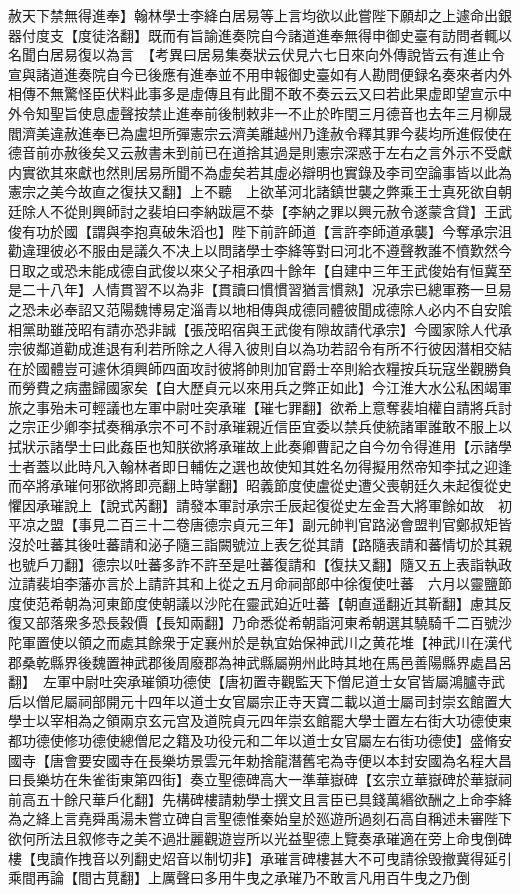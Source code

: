 赦天下禁無得進奉】翰林學士李絳白居易等上言均欲以此嘗陛下願却之上遽命出銀器付度支【度徒洛翻】既而有旨諭進奏院自今諸道進奉無得申御史臺有訪問者輒以名聞白居易復以為言　【考異曰居易集奏狀云伏見六七日來向外傳說皆云有進止令宣與諸道進奏院自今已後應有進奉並不用申報御史臺如有人勘問便録名奏來者内外相傳不無驚怪臣伏料此事多是虛傳且有此聞不敢不奏云云又曰若此果虚即望宣示中外令知聖旨使息虚聲按禁止進奉前後制敕非一不止於昨閏三月德音也去年三月柳晟閻濟美違赦進奉已為盧坦所彈憲宗云濟美離越州乃逢赦令釋其罪今裴均所進假使在德音前亦赦後矣又云赦書未到前已在道捨其過是則憲宗深惑于左右之言外示不受獻内實欲其來獻也然則居易所聞不為虚矣若其虛必辯明也實錄及李司空論事皆以此為憲宗之美今故直之復扶又翻】上不聽　上欲革河北諸鎮世襲之弊乘王士真死欲自朝廷除人不從則興師討之裴垍曰李納跋扈不㳟【李納之罪以興元赦令遂蒙含貸】王武俊有功於國【謂與李抱真破朱滔也】陛下前許師道【言許李師道承襲】今奪承宗沮勸違理彼必不服由是議久不决上以問諸學士李絳等對曰河北不遵聲教誰不憤歎然今日取之或恐未能成德自武俊以來父子相承四十餘年【自建中三年王武俊始有恒冀至是二十八年】人情貫習不以為非【貫讀曰慣慣習猶言慣熟】况承宗已總軍務一旦易之恐未必奉詔又范陽魏博易定淄青以地相傳與成德同體彼聞成德除人必内不自安隂相黨助雖茂昭有請亦恐非誠【張茂昭宿與王武俊有隙故請代承宗】今國家除人代承宗彼鄰道勸成進退有利若所除之人得入彼則自以為功若詔令有所不行彼因潛相交結在於國體豈可遽休須興師四面攻討彼將帥則加官爵士卒則給衣糧按兵玩寇坐觀勝負而勞費之病盡歸國家矣【自大歷貞元以來用兵之弊正如此】今江淮大水公私困竭軍旅之事殆未可輕議也左軍中尉吐突承璀【璀七罪翻】欲希上意奪裴垍權自請將兵討之宗正少卿李拭奏稱承宗不可不討承璀親近信臣宜委以禁兵使統諸軍誰敢不服上以拭狀示諸學士曰此姦臣也知朕欲將承璀故上此奏卿曹記之自今勿令得進用【示諸學士者蓋以此時凡入翰林者即日輔佐之選也故使知其姓名勿得擬用然帝知李拭之迎逢而卒將承璀何邪欲將即亮翻上時掌翻】昭義節度使盧從史遭父喪朝廷久未起復從史懼因承璀說上【說式芮翻】請發本軍討承宗壬辰起復從史左金吾大將軍餘如故　初平凉之盟【事見二百三十二卷唐德宗貞元三年】副元帥判官路泌會盟判官鄭叔矩皆沒於吐蕃其後吐蕃請和泌子隨三詣闕號泣上表乞從其請【路隨表請和蕃情切於其親也號戶刀翻】德宗以吐蕃多詐不許至是吐蕃復請和【復扶又翻】隨又五上表詣執政泣請裴垍李藩亦言於上請許其和上從之五月命祠部郎中徐復使吐蕃　六月以靈鹽節度使范希朝為河東節度使朝議以沙陀在靈武廹近吐蕃【朝直遥翻近其靳翻】慮其反復又部落衆多恐長穀價【長知兩翻】乃命悉從希朝詣河東希朝選其驍騎千二百號沙陀軍置使以領之而處其餘衆于定襄州於是執宜始保神武川之黄花堆【神武川在漢代郡桑乾縣界後魏置神武郡後周廢郡為神武縣屬朔州此時其地在馬邑善陽縣界處昌呂翻】　左軍中尉吐突承璀領功德使【唐初置寺觀監天下僧尼道士女官皆屬鴻臚寺武后以僧尼屬祠部開元十四年以道士女官屬宗正寺天寶二載以道士屬司封崇玄館置大學士以宰相為之領兩京玄元宫及道院貞元四年崇玄館罷大學士置左右街大功德使東都功德使修功德使總僧尼之籍及功役元和二年以道士女官屬左右街功德使】盛脩安國寺【唐會要安國寺在長樂坊景雲元年勅捨龍潛舊宅為寺便以本封安國為名程大昌曰長樂坊在朱雀街東第四街】奏立聖德碑高大一準華嶽碑【玄宗立華嶽碑於華嶽祠前高五十餘尺華戶化翻】先構碑樓請勅學士撰文且言臣已具錢萬緡欲酬之上命李絳為之絳上言堯舜禹湯未嘗立碑自言聖德惟秦始皇於廵遊所過刻石高自稱述未審陛下欲何所法且叙修寺之美不過壯麗觀遊豈所以光益聖德上覽奏承璀適在旁上命曳倒碑樓【曳讀作拽音以列翻史炤音以制切非】承璀言碑樓甚大不可曳請徐毁撤冀得延引乘間再論【間古莧翻】上厲聲曰多用牛曳之承璀乃不敢言凡用百牛曳之乃倒

